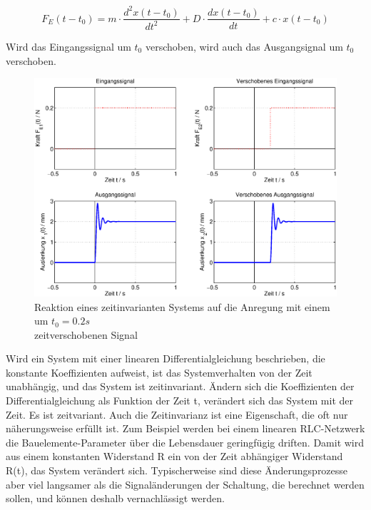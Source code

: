 \begin{equation}\label{eq:threefourtyfour}
F_{E}(t-t_{0})= m\cdot \frac{d^2x(t-t_{0})}{dt^2}+D\cdot \frac{dx(t-t_{0})}{dt} + c\cdot x(t-t_{0})
\end{equation}

\noindent Wird das Eingangssignal um $t_{0}$ verschoben, wird auch das Ausgangsignal um $t_{0}$ verschoben.
\clearpage
\begin{figure}[H]
  \centerline{\includegraphics[width=1\textwidth]{Kapitel2/Bilder/image10}}
  \caption{Reaktion eines zeitinvarianten Systems auf die Anregung mit einem um $t_{0} = 0.2 s$\\ zeitverschobenen Signal} 
  \label{fig:Zeitinvarianz}
\end{figure}

\noindent Wird ein System mit einer linearen Differentialgleichung beschrieben, die konstante Koeffizienten
aufweist, ist das Systemverhalten von der Zeit unabhängig, und das System ist zeitinvariant. Ändern sich die Koeffizienten der Differentialgleichung als Funktion der Zeit t, verändert sich das System mit der Zeit. Es ist zeitvariant.\newline
Auch die Zeitinvarianz ist eine Eigenschaft, die oft nur näherungsweise erfüllt ist. Zum Beispiel werden bei einem linearen RLC-Netzwerk die Bauelemente-Parameter über die Lebensdauer geringfügig driften. Damit wird aus einem konstanten Widerstand R ein von der Zeit abhängiger Widerstand R(t), das System verändert sich. Typischerweise sind diese Änderungsprozesse aber viel langsamer als die Signaländerungen der Schaltung, die berechnet werden sollen, und können deshalb vernachlässigt werden.

